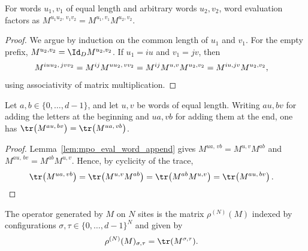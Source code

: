 \begin{lemma}\label{lem:mpo_eval_word_append}
    \leanok
    For words $u_1,v_1$ of equal length and arbitrary words $u_2,v_2$,
    word evaluation factors as
    $M^{u_1u_2,\,v_1v_2}=M^{u_1,v_1}M^{u_2,v_2}$.
\end{lemma}

\begin{proof}\leanok{}
    We argue by induction on the common length of $u_1$ and $v_1$. For the
    empty prefix, $M^{u_2,v_2}=\Id_D M^{u_2,v_2}$. If $u_1=iu$ and
    $v_1=jv$, then
    \begin{align}
        M^{iuu_2,\,jvv_2}
         & =M^{ij}M^{uu_2,\,vv_2}
        =M^{ij}M^{u,v}M^{u_2,v_2}
        =M^{iu,jv}M^{u_2,v_2},
        \notag
    \end{align}
    using associativity of matrix multiplication.
\end{proof}

\begin{lemma}\label{lem:mpo_trace_evalWord_cyclic}
    \leanok
    Let $a,b\in\{0,\ldots,d{-}1\}$, and let $u,v$ be words of equal length.
    Writing $au,bv$ for adding the letters at the beginning and $ua,vb$ for
    adding them at the end, one has
    $\tr\!\left(M^{au,\,bv}\right)=\tr\!\left(M^{ua,\,vb}\right)$.
\end{lemma}

\begin{proof}\leanok{}
    Lemma~\ref{lem:mpo_eval_word_append} gives
    $M^{ua,\,vb}=M^{u,v}M^{ab}$ and
    $M^{au,\,bv}=M^{ab}M^{u,v}$. Hence, by cyclicity of the trace,
    \begin{align}
        \tr\!\left(M^{ua,\,vb}\right)
         & =\tr\!\left(M^{u,v}M^{ab}\right)
        =\tr\!\left(M^{ab}M^{u,v}\right)
        =\tr\!\left(M^{au,\,bv}\right).
        \notag
    \end{align}
\end{proof}

\begin{definition}\label{def:mpo_family}
    \leanok
    The operator generated by $M$ on $N$ sites is the matrix
    $\rho^{(N)}(M)$ indexed by configurations
    $\sigma,\tau\in\{0,\ldots,d{-}1\}^N$ and given by
    \begin{align}
        \rho^{(N)}(M)_{\sigma,\tau}
         & =\tr(M^{\sigma,\tau}).
        \label{eq:mpdo_family}
    \end{align}
\end{definition}

